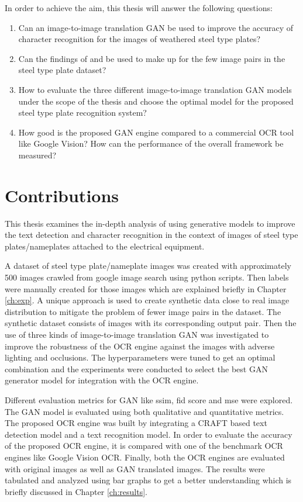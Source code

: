 In order to achieve the aim, this thesis will answer the following questions:
\begin{enumerate}
\item Can an image-to-image translation GAN be used to improve the accuracy of character recognition for the images of weathered steel type plates?
\item Can the findings of \citeauthor{CycleGAN2017} and \citeauthor{stoller2019training} be used to make up for the few image pairs in the steel type plate dataset?
\item How to evaluate the three different image-to-image translation GAN models under the scope of the thesis and choose the optimal model for the proposed steel type plate recognition system?
\item How good is the proposed GAN engine compared to a commercial OCR tool like Google Vision? How can the performance of the overall framework be measured?	
\end{enumerate}

\section{Contributions}  	
	This thesis examines the in-depth analysis of using generative models to improve the text detection and character recognition in the context of images of steel type plates/nameplates attached to the electrical equipment.
\newline
	
	A dataset of steel type plate/nameplate images was created with approximately 500 images crawled from google image search using python scripts. Then labels were manually created for those images which are explained briefly in Chapter \ref{ch:exp}. A unique approach is used to create synthetic data close to real image distribution to mitigate the problem of fewer image pairs in the dataset. The synthetic dataset consists of images with its corresponding output pair. Then the use of three kinds of image-to-image translation GAN was investigated to improve the robustness of the OCR engine against the images with adverse lighting and occlusions. The hyperparameters were tuned to get an optimal combination and the experiments were conducted to select the best GAN generator model for integration with the OCR engine.
\newline
	
	Different evaluation metrics for GAN like \gls{ssim}, \gls{fid} score and \gls{mse} were explored. The GAN model is evaluated using both qualitative and quantitative metrics. The proposed OCR engine was built by integrating a CRAFT based text detection model and a text recognition model. In order to evaluate the accuracy of the proposed OCR engine, it is compared with one of the benchmark OCR engines like Google Vision OCR. Finally, both the OCR engines are evaluated with original images as well as GAN translated images. The results were tabulated and analyzed using bar graphs to get a better understanding which is briefly discussed in Chapter \ref{ch:results}.
 
